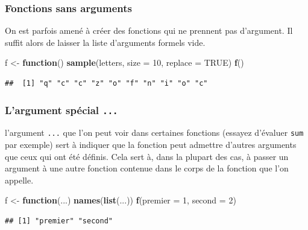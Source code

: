 \documentclass[
  11pt,
]{book}
\newenvironment{Shaded}{\begin{snugshade}}{\end{snugshade}}
\newcommand{\ControlFlowTok}[1]{\textcolor[rgb]{0.13,0.29,0.53}{\textbf{#1}}}
\newcommand{\DataTypeTok}[1]{\textcolor[rgb]{0.13,0.29,0.53}{#1}}
\newcommand{\DecValTok}[1]{\textcolor[rgb]{0.00,0.00,0.81}{#1}}
\newcommand{\KeywordTok}[1]{\textcolor[rgb]{0.13,0.29,0.53}{\textbf{#1}}}
\newcommand{\NormalTok}[1]{#1}
\newcommand{\OtherTok}[1]{\textcolor[rgb]{0.56,0.35,0.01}{#1}}
\newcommand{\StringTok}[1]{\textcolor[rgb]{0.31,0.60,0.02}{#1}}
\numberwithin{equation}{section}
\numberwithin{countremarque}{section}
\begin{document}
\hypertarget{fonctions_structure_parametres_sans}{%
\subsubsection{Fonctions sans arguments}\label{fonctions_structure_parametres_sans}}

On est parfois amené à créer des fonctions qui ne prennent pas d'argument. Il suffit alors de laisser la liste d'arguments formels vide.

\begin{Shaded}
\begin{Highlighting}[]
\NormalTok{f \textless{}{-}}\StringTok{ }\ControlFlowTok{function}\NormalTok{() }\KeywordTok{sample}\NormalTok{(letters, }\DataTypeTok{size =} \DecValTok{10}\NormalTok{, }\DataTypeTok{replace =} \OtherTok{TRUE}\NormalTok{)}
\KeywordTok{f}\NormalTok{()}
\end{Highlighting}
\end{Shaded}

\begin{lstlisting}
##  [1] "q" "c" "c" "z" "o" "f" "n" "i" "o" "c"
\end{lstlisting}

\hypertarget{fonctions_structure_parametres_special}{%
\subsubsection{\texorpdfstring{L'argument spécial \texttt{...}}{L'argument spécial ...}}\label{fonctions_structure_parametres_special}}

l'argument \texttt{...} que l'on peut voir dans certaines fonctions (essayez d'évaluer \texttt{sum} par exemple) sert à indiquer que la fonction peut admettre d'autres arguments que ceux qui ont été définis. Cela sert à, dans la plupart des cas, à passer un argument à une autre fonction contenue dans le corps de la fonction que l'on appelle.

\begin{Shaded}
\begin{Highlighting}[]
\NormalTok{f \textless{}{-}}\StringTok{ }\ControlFlowTok{function}\NormalTok{(...) }\KeywordTok{names}\NormalTok{(}\KeywordTok{list}\NormalTok{(...))}
\KeywordTok{f}\NormalTok{(}\DataTypeTok{premier =} \DecValTok{1}\NormalTok{, }\DataTypeTok{second =} \DecValTok{2}\NormalTok{)}
\end{Highlighting}
\end{Shaded}

\begin{lstlisting}
## [1] "premier" "second"
\end{lstlisting}
\end{document}
